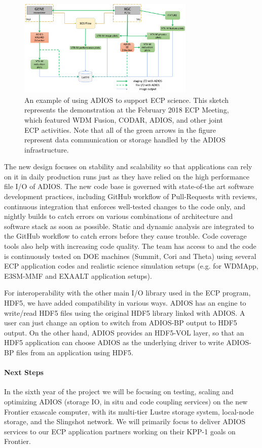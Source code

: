 \begin{figure}[!th]
	\begin{center}
		\includegraphics[width=0.75\textwidth]{projects/2.3.4-DataViz/2.3.4.09-ADIOS/ADIOS_in_ECP.png}
		\caption{An example of using ADIOS to support ECP science.  This sketch represents the demonstration at the February 2018 ECP Meeting, which featured WDM Fusion, CODAR, ADIOS, and other joint ECP activities.  Note that all of the green arrows in the figure represent data communication or storage handled by the ADIOS infrastructure.}
		\label{fig:adios-example}
	\end{center}
\end{figure}

The new design focuses on stability and scalability so that applications can rely on it in daily production runs just as they have relied on the high performance file I/O of ADIOS. The new code base is governed with state-of-the art software development practices, including GitHub workflow of Pull-Requests with reviews, continuous integration that enforces well-tested changes to the code only, and nightly builds to catch errors on various combinations of architecture and software stack as soon as possible. Static and dynamic analysis are integrated to the GitHub workflow to catch errors before they cause trouble. Code coverage tools also help with increasing code quality. The team has access to and the code is continuously tested on DOE machines (Summit, Cori and Theta) using several ECP application codes and realistic science simulation setups (e.g. for WDMApp, E3SM-MMF and EXAALT application setups). 

For interoperability with the other main I/O library used in the ECP program, HDF5, we have added compatibility in various ways.
ADIOS has an engine to write/read HDF5 files using the original HDF5 library linked with ADIOS. A user can just change an option to switch from ADIOS-BP output to HDF5 output. On the other hand, ADIOS provides an HDF5-VOL layer, so that an HDF5 application can choose ADIOS as the underlying driver to write ADIOS-BP files from an application using HDF5. 


\paragraph{Next Steps}
In the sixth year of the project we will be focusing on testing, scaling and optimizing ADIOS (storage IO, in situ and code coupling services) on the new Frontier exascale computer, with its multi-tier Lustre storage system, local-node storage, and the Slingshot network. We will primarily focus to deliver ADIOS services to our ECP application partners working on their KPP-1 goals on Frontier. 
